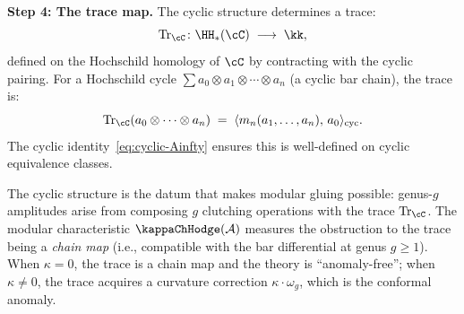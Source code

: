 \begin{construction}
\textbf{Step 4: The trace map.} The cyclic structure determines a trace:
\[
\Tr_\cC \colon \HH_\ast(\cC) \;\longrightarrow\; \kk,
\]
defined on the Hochschild homology of $\cC$ by contracting with the cyclic pairing. For a Hochschild cycle $\sum a_0 \otimes a_1 \otimes \cdots \otimes a_n$ (a cyclic bar chain), the trace is:
\[
\Tr_\cC(a_0 \otimes \cdots \otimes a_n) \;=\; \langle m_n(a_1, \ldots, a_n),\, a_0 \rangle_{\mathrm{cyc}}.
\]
The cyclic identity~\eqref{eq:cyclic-Ainfty} ensures this is well-defined on cyclic equivalence classes.
\end{construction}

\begin{remark}
\label{rem:cyclic-modularity}
The cyclic structure is the datum that makes modular gluing possible: genus-$g$ amplitudes arise from composing $g$ clutching operations with the trace $\Tr_\cC$. The modular characteristic $\kappaChHodge(\cA)$ measures the obstruction to the trace being a \emph{chain map} (i.e., compatible with the bar differential at genus $g \geq 1$). When $\kappa = 0$, the trace is a chain map and the theory is ``anomaly-free''; when $\kappa \neq 0$, the trace acquires a curvature correction $\kappa \cdot \omega_g$, which is the conformal anomaly.
\end{remark}

